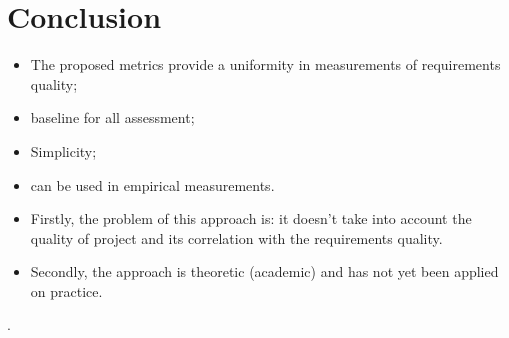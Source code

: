 \section{Conclusion}
\label{sec:conclusion}

\begin{itemize}
	\item The proposed metrics provide a uniformity in measurements of requirements quality; 
	\item baseline for all assessment; 
	\item Simplicity; 
	\item can be used in empirical measurements.
\end{itemize}


\begin{itemize}
	\item  Firstly,  the problem of this approach is: it doesn't take into account the quality of project and its correlation with the requirements quality.
\item Secondly, the approach is theoretic (academic) and has not yet been applied on practice.
\end{itemize}
.